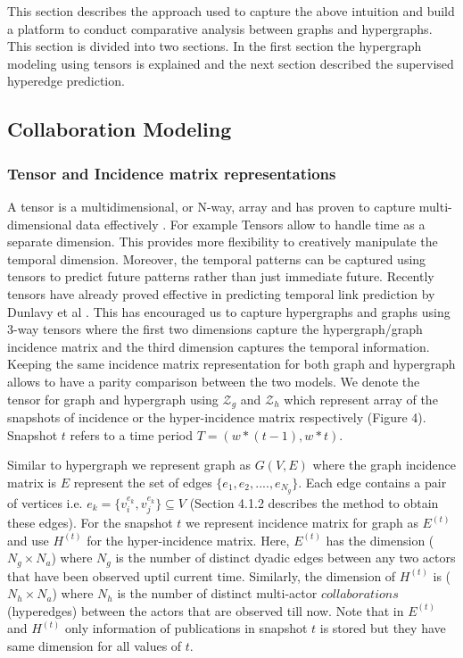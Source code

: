 \documentclass{sig-alternate}
\begin{document}
This section describes the approach used to capture the above intuition and build a platform to conduct comparative analysis between graphs and hypergraphs. This section is divided into two sections. In the first section the hypergraph modeling using tensors is explained and the next section described the supervised hyperedge prediction. 

\subsection{Collaboration Modeling}

\subsubsection{Tensor and Incidence matrix representations}

A tensor is a multidimensional, or N-way, array \cite{pearson2012spectral} and has proven to capture multi-dimensional data effectively \cite{kolda07}. For example Tensors allow to handle time as a separate dimension. This provides more flexibility to creatively manipulate the temporal dimension. Moreover, the temporal patterns can be captured using tensors to predict future patterns rather than just immediate future. Recently tensors have already proved effective in predicting temporal link prediction by Dunlavy et al \cite{kolda11}. This has encouraged us to capture hypergraphs and graphs using 3-way tensors where the first two dimensions capture the hypergraph/graph incidence matrix and the third dimension captures the temporal information. Keeping the same incidence matrix representation for both graph and hypergraph allows to have a parity comparison between the two models. 
We denote the tensor for graph and hypergraph using $\mathscr{Z}_{g}$ and $\mathscr{Z}_{h}$ which represent array of the snapshots of incidence or the hyper-incidence matrix respectively (Figure 4). Snapshot \(t\) refers to a time period \(T=(w*(t-1), w*t)\). 

Similar to hypergraph we represent graph as \(G(V,E)\) where the graph incidence matrix is \(E\) represent the set of edges $\{e_1,e_2,....,e_{N_g}\}$. Each edge contains a pair of vertices i.e. \(e_k=\{v_i^{e_k},v_j^{e_k}\} \subseteq V\) (Section 4.1.2 describes the method to obtain these edges). For the snapshot \(t\) we represent incidence matrix for graph as \(E^{(t)}\) and use \(H^{(t)}\) for the hyper-incidence matrix. Here, \(E^{(t)}\) has the dimension (\(N_{g}\times N_{a}\)) where \(N_{g}\) is the number of distinct dyadic edges between any two actors that have been observed uptil current time. Similarly, the dimension of \(H^{(t)}\) is (\(N_{h}\times N_{a}\)) where \(N_{h}\) is the number of distinct multi-actor $collaborations$ (hyperedges) between the actors that are observed till now. Note that in \(E^{(t)}\) and \(H^{(t)}\) only information of publications in snapshot $t$ is stored but they have same dimension for all values of $t$.
\end{document}
